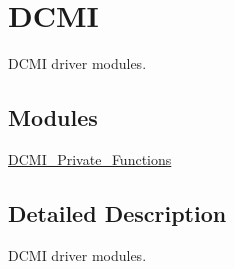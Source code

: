 \hypertarget{group___d_c_m_i}{\section{D\-C\-M\-I}
\label{group___d_c_m_i}
}


D\-C\-M\-I driver modules.  


\subsection*{Modules}
\begin{DoxyCompactItemize}
\item 
\hyperlink{group___d_c_m_i___private___functions}{D\-C\-M\-I\-\_\-\-Private\-\_\-\-Functions}
\end{DoxyCompactItemize}


\subsection{Detailed Description}
D\-C\-M\-I driver modules. 